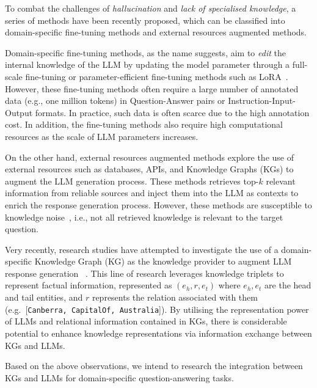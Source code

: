 To combat the challenges of \emph{hallucination} and \emph{lack of specialised knowledge}, a series of methods have been recently proposed, which can be classified into domain-specific fine-tuning methods and external resources augmented methods.

Domain-specific fine-tuning methods, as the name suggests, aim to \emph{edit} the internal knowledge of the LLM by updating the model parameter through a full-scale fine-tuning or parameter-efficient fine-tuning methods such as LoRA~\parencite{lora}.
However, these fine-tuning methods often require a large number of annotated data (e.g., one million tokens) in Question-Answer pairs or Instruction-Input-Output formats. In practice, such data is often scarce due to the high annotation cost. 
In addition, the fine-tuning methods also require high computational resources as the scale of LLM parameters increases.

On the other hand, external resources augmented methods explore the use of external resources such as databases, APIs, and Knowledge Graphs (KGs) to augment the LLM generation process. 
These methods retrieves top-$k$ relevant information from reliable sources and inject them into the LLM as contexts to enrich the response generation process.
However, these methods are susceptible to knowledge noise~\parencite{kbert}, i.e., not all retrieved knowledge is relevant to the target question.

Very recently, research studies have attempted to investigate the use of a domain-specific Knowledge Graph (KG) as the knowledge
provider to augment LLM response generation ~\parencite{gnp, graph-prompter, kalm-prompting}.
This line of research leverages knowledge triplets to represent factual information, represented as $(e_h, r, e_t)$ where $e_h, e_t$ are the head and tail entities, and $r$ represents the relation associated with them (e.g.\ [\texttt{Canberra, CapitalOf, Australia}]).
By utilising the representation power of LLMs and relational information contained in KGs, there is considerable potential to enhance knowledge representations via information exchange between KGs and LLMs.

Based on the above observations, we intend to research the integration between KGs and LLMs for domain-specific question-answering tasks. 
